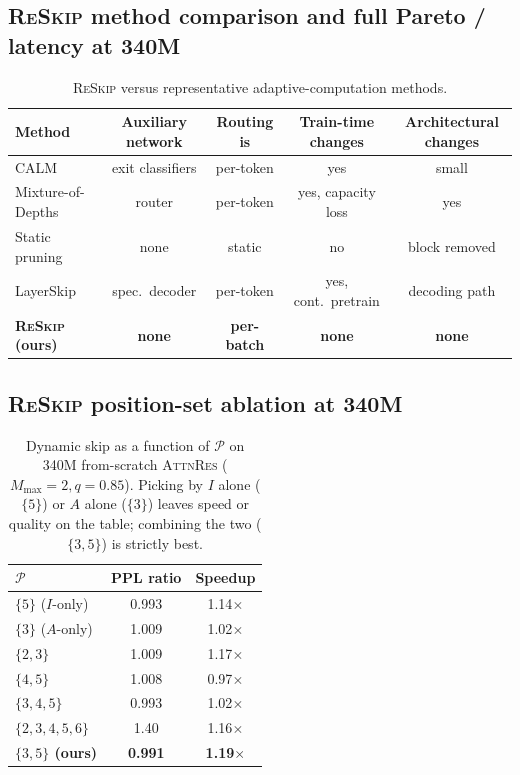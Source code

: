 \documentclass{article}
\newcommand{\attnres}{\textsc{AttnRes}}
\newcommand{\reskip}{\textsc{ReSkip}}
\begin{document}
\subsection{\reskip{} method comparison and full Pareto / latency at 340M}
\label{app:method_comparison}
\begin{table}[h]
\caption{\reskip{} versus representative adaptive-computation methods.}
\centering\small
\begin{tabular}{lcccc}
\toprule
Method & Auxiliary network & Routing is & Train-time changes & Architectural changes \\
\midrule
CALM~\citep{schuster2022confident} & exit classifiers & per-token & yes & small \\
Mixture-of-Depths~\citep{raposo2024mixture} & router & per-token & yes, capacity loss & yes \\
Static pruning~\citep{gromov2024unreasonable} & none & static & no & block removed \\
LayerSkip~\citep{elhoushi2024layerskip} & spec.\ decoder & per-token & yes, cont.\ pretrain & decoding path \\
\textbf{\reskip{} (ours)} & \textbf{none} & \textbf{per-batch} & \textbf{none} & \textbf{none} \\
\bottomrule
\end{tabular}
\end{table}

\subsection{\reskip{} position-set ablation at 340M}
\label{app:reskip_position_ablation}
\begin{table}[h]
\caption{Dynamic skip as a function of $\mathcal{P}$ on 340M from-scratch \attnres{} ($M_{\max}{=}2, q{=}0.85$). Picking by $I$ alone ($\{5\}$) or $A$ alone ($\{3\}$) leaves speed or quality on the table; combining the two ($\{3,5\}$) is strictly best.}
\label{tab:reskip_position_ablation}
\centering\small
\begin{tabular}{lcc}
\toprule
$\mathcal{P}$ & PPL ratio & Speedup \\
\midrule
$\{5\}$ ($I$-only) & 0.993 & 1.14$\times$ \\
$\{3\}$ ($A$-only) & 1.009 & 1.02$\times$ \\
$\{2,3\}$ & 1.009 & 1.17$\times$ \\
$\{4,5\}$ & 1.008 & 0.97$\times$ \\
$\{3,4,5\}$ & 0.993 & 1.02$\times$ \\
$\{2,3,4,5,6\}$ & 1.40 & 1.16$\times$ \\
\midrule
\textbf{$\{3,5\}$ (ours)} & \textbf{0.991} & \textbf{1.19$\times$} \\
\bottomrule
\end{tabular}
\end{table}
\end{document}
